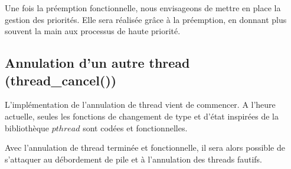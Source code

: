 Une fois la préemption fonctionnelle, nous envisageons de mettre en place la gestion des priorités. Elle sera réalisée grâce à la préemption, en donnant plus souvent la main aux processus de haute priorité.
 
\subsection{Annulation d'un autre thread (thread\_cancel())}
L'implémentation de l'annulation de thread vient de commencer. A l'heure actuelle, seules les fonctions de changement de type et d'état inspirées de la bibliothèque $pthread$ sont codées et fonctionnelles.

Avec l'annulation de thread terminée et fonctionnelle, il sera alors possible de s'attaquer au débordement de pile et à l'annulation des threads fautifs.
